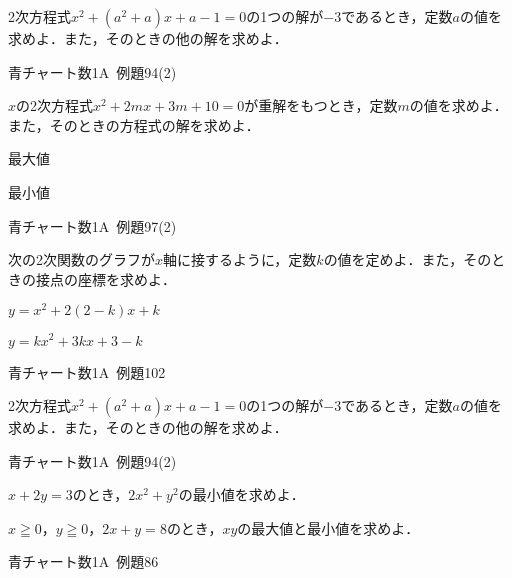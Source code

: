 \documentclass[b4paper, dvipdfmx, 11pt, fleqn, twocolumn, uplatex]{jsarticle}
\newenvironment{tabbedenum}[1]
{\NumTabs{#1}\begin{enumerate*}[label={(\arabic*)},itemjoin={\tab}]}{\end{enumerate*}}
\begin{document}

\begin{screen}
2次方程式$x^2+(a^2+a)x+a-1=0$の1つの解が$-3$であるとき，定数$a$の値を求めよ．また，そのときの他の解を求めよ．
\begin{flushright}
    青チャート数1A~例題94(2)
\end{flushright}
\end{screen}


\begin{screen}
$x$の2次方程式$x^2+2mx+3m+10=0$が重解をもつとき，定数$m$の値を求めよ．また，そのときの方程式の解を求めよ．
\begin{tabbedenum}{2}
	\item 最大値
	\item 最小値
\end{tabbedenum}
\begin{flushright}
    青チャート数1A~例題97(2)
\end{flushright}
\end{screen}


\begin{screen}
次の2次関数のグラフが$x$軸に接するように，定数$k$の値を定めよ．また，そのときの接点の座標を求めよ．
\begin{tabbedenum}{2}
	\item $y=x^2+2(2-k)x+k$
	\item $y=kx^2+3kx+3-k$
\end{tabbedenum}
\begin{flushright}
    青チャート数1A~例題102
\end{flushright}
\end{screen}


\begin{screen}
2次方程式$x^2+(a^2+a)x+a-1=0$の1つの解が$-3$であるとき，定数$a$の値を求めよ．また，そのときの他の解を求めよ．
\begin{flushright}
    青チャート数1A~例題94(2)
\end{flushright}
\end{screen}



\begin{screen}
\begin{tabbedenum}{2}
	\item $x+2y=3$のとき，$2x^2+y^2$の最小値を求めよ．
	\item $x\geqq0$，$y\geqq0$，$2x+y=8$のとき，$xy$の最大値と最小値を求めよ．
\end{tabbedenum}
\begin{flushright}
    青チャート数1A~例題86
\end{flushright}
\end{screen}
\end{document}
